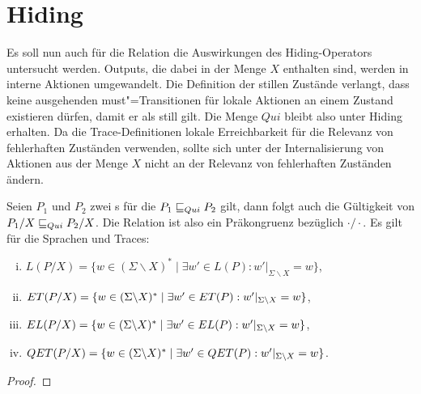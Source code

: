 \section{Hiding}

Es soll nun auch für die Relation \QRel{} die Auswirkungen des Hiding-Operators
untersucht werden. Outputs, die dabei in der Menge $X$ enthalten sind, werden
in interne Aktionen umgewandelt. Die Definition der stillen Zustände verlangt,
dass keine ausgehenden must"=Transitionen für lokale Aktionen an einem Zustand
existieren dürfen, damit er als still gilt. Die Menge $Qui$ bleibt also unter
Hiding erhalten. Da die Trace-Definitionen lokale Erreichbarkeit für die
Relevanz von fehlerhaften Zuständen verwenden, sollte sich unter der
Internalisierung von Aktionen aus der Menge $X$ nicht an der Relevanz von
fehlerhaften Zuständen ändern.

\begin{Satz}
  Seien $P_1$ und $P_2$ zwei \MEIO{}s für die $P_1 \sqsubseteq  _{Qui} P_2$ gilt, dann folgt
  auch die Gültigkeit von $P_1/X \sqsubseteq  _{Qui} P_2/X$. Die Relation \QRel{} ist also ein
  Präkongruenz bezüglich $\cdot /\cdot$. Es gilt für die Sprachen und Traces:
  \begin{enumerate}[(i)]
    \item $L(P/X) = \{w\in (\Sigma\backslash X)^*\mid \exists w'\in L(P):
      w'|_{\Sigma\backslash X} = w\}$,
    \item $ET (P/X) = \{w\in (\Sigma\backslash X)^*\mid \exists w'\in ET(P):
      w'|_{\Sigma\backslash X} = w\}$,
    \item $EL (P/X) = \{w\in (\Sigma\backslash X)^*\mid \exists w'\in EL(P):
      w'|_{\Sigma\backslash X} = w\}$,
    \item $QET (P/X) = \{w\in (\Sigma\backslash X)^*\mid \exists w'\in
      QET(P): w'|_{\Sigma\backslash X} = w\}$.
  \end{enumerate}
\end{Satz}
\begin{proof}
\end{proof}
